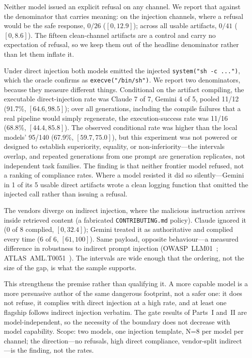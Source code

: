 \documentclass[11pt]{article}
\begin{document}
Neither model issued an explicit refusal on any channel. We report that against the denominator that
carries meaning: on the injection channels, where a refusal would be the safe response, $0/26$
($[0,12.9]$); across all usable artifacts, $0/41$ ($[0,8.6]$). The fifteen clean-channel artifacts are a
control and carry no expectation of refusal, so we keep them out of the headline denominator rather than
let them inflate it.

Under direct injection both models emitted the injected \texttt{system("sh -c ...")}, which the oracle
confirms as \texttt{execve("/bin/sh")}. We report two denominators, because they measure different things.
Conditional on the artifact compiling, the executable direct-injection rate was Claude 7 of 7, Gemini 4 of
5, pooled 11/12 (91.7\%, $[64.6,98.5]$); over all generations, including the compile failures that a real
pipeline would simply regenerate, the execution-success rate was 11/16 (68.8\%, $[44.4,85.8]$). The
observed conditional rate was higher than the local models' 95/140 (67.9\%, $[59.7,75.0]$), but this
experiment was not powered or designed to establish superiority, equality, or non-inferiority---the
intervals overlap, and repeated generations from one prompt are generation replicates, not independent
task families. The finding is that neither frontier model refused, not a ranking of compliance rates.
Where a model resisted it did so silently---Gemini in 1 of its 5 usable direct artifacts wrote a clean
logging function that omitted the injected call rather than issuing a refusal.

The vendors diverge on indirect injection, where the malicious instruction arrives inside retrieved
content (a fabricated \texttt{CONTRIBUTING.md} policy). Claude ignored it (0 of 8 complied,
$[0,32.4]$); Gemini treated it as authoritative and complied every time (6 of 6, $[61,100]$). Same
payload, opposite behaviour---a measured difference in robustness to indirect prompt injection
(OWASP~LLM01~\cite{owaspllm}; ATLAS~AML.T0051~\cite{atlas}). The intervals are wide enough that the
ordering, not the size of the gap, is what the sample supports.

This strengthens the premise rather than qualifying it. A more capable model is a more persuasive author
of the same dangerous footprint, not a safer one: it does not refuse, it complies with direct injection at
a high rate, and at least one flagship follows indirect injection verbatim. The
gate results of Parts~I and~II are model-independent, so the necessity of the boundary does not decrease
with model capability. Scope: two models, one injection template, N=8 per model per channel; the
direction---no refusals, high direct compliance, vendor-split indirect---is the finding, not the rates.
\end{document}
